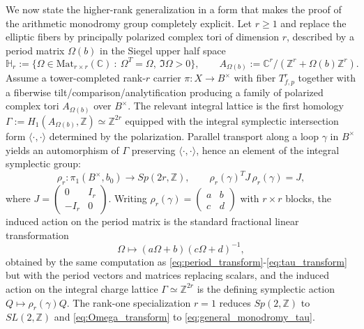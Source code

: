 \documentclass[11pt]{article}
\theoremstyle{remark}
\begin{document}
We now state the higher-rank generalization in a form that makes the proof of the arithmetic monodromy group completely explicit. Let $r\ge 1$ and replace the elliptic fibers by principally polarized complex tori of dimension $r$, described by a period matrix $\Omega(b)$ in the Siegel upper half space
\begin{equation}\label{eq:siegela}
\mathbb{H}_r:=\{\Omega\in \mathrm{Mat}_{r\times r}(\mathbb{C})\ :\ \Omega^T=\Omega,\ \Im\Omega>0\},\qquad A_{\Omega(b)}:=\mathbb{C}^r/(\mathbb{Z}^r+\Omega(b)\mathbb{Z}^r).
\end{equation}
Assume a tower-completed rank-$r$ carrier $\pi:X\to B^\times$ with fiber $T^r_{f,p}$ together with a fiberwise tilt/comparison/analytification producing a family of polarized complex tori $A_{\Omega(b)}$ over $B^\times$. The relevant integral lattice is the first homology $\Gamma:=H_1(A_{\Omega(b)},\mathbb{Z})\simeq\mathbb{Z}^{2r}$ equipped with the integral symplectic intersection form $\langle\cdot,\cdot\rangle$ determined by the polarization. Parallel transport along a loop $\gamma$ in $B^\times$ yields an automorphism of $\Gamma$ preserving $\langle\cdot,\cdot\rangle$, hence an element of the integral symplectic group:
\begin{equation}\label{eq:Sp_monodromy}
\rho_r:\pi_1(B^\times,b_0)\longrightarrow Sp(2r,\mathbb{Z}),\qquad \rho_r(\gamma)^T J\,\rho_r(\gamma)=J,
\end{equation}
where $J=\begin{pmatrix}0&I_r\\ -I_r&0\end{pmatrix}$. Writing $\rho_r(\gamma)=\begin{pmatrix}a&b\\ c&d\end{pmatrix}$ with $r\times r$ blocks, the induced action on the period matrix is the standard fractional linear transformation
\begin{equation}\label{eq:Omega_transform}
\Omega\longmapsto (a\Omega+b)(c\Omega+d)^{-1},
\end{equation}
obtained by the same computation as \eqref{eq:period_transform}-\eqref{eq:tau_transform} but with the period vectors and matrices replacing scalars, and the induced action on the integral charge lattice $\Gamma\simeq\mathbb{Z}^{2r}$ is the defining symplectic action $Q\mapsto \rho_r(\gamma)Q$. The rank-one specialization $r=1$ reduces $Sp(2,\mathbb{Z})$ to $SL(2,\mathbb{Z})$ and \eqref{eq:Omega_transform} to \eqref{eq:general_monodromy_tau}.
\end{document}
